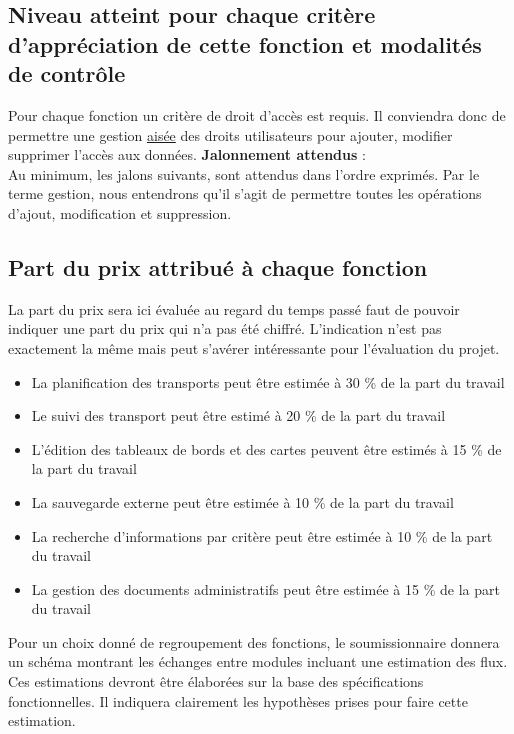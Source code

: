 \subsection{Niveau atteint pour chaque critère d'appréciation de cette fonction et modalités de contrôle}
Pour chaque fonction un critère de droit d'accès est requis. Il conviendra donc de permettre une gestion \underline{aisée} des droits utilisateurs pour ajouter, modifier supprimer l'accès aux données.
\textbf{Jalonnement attendus} :
\\
Au minimum, les jalons suivants, sont attendus dans l'ordre exprimés. Par le terme \og{}gestion\fg{}, nous entendrons qu'il s'agit de permettre toutes les opérations d'ajout, modification et suppression.

\subsection{Part du prix attribué à chaque fonction}
La part du prix sera ici évaluée au regard du temps passé faut de pouvoir indiquer une part du prix qui n'a pas été chiffré. L'indication n'est pas exactement la même mais peut s'avérer intéressante pour l'évaluation du projet. 
\begin{itemize}
 \item La planification des transports peut être estimée à 30 \% de la part du travail
 \item Le suivi des transport peut être estimé à 20 \% de la part du travail
 \item L'édition des tableaux de bords et des cartes peuvent être estimés à 15 \% de la part du travail
 \item La sauvegarde externe peut être estimée à 10 \% de la part du travail
 \item La recherche d'informations par critère peut être estimée à 10 \% de la part du travail
 \item La gestion des documents administratifs peut être estimée à 15 \% de la part du travail
\end{itemize}
Pour un choix donné de regroupement des fonctions, le soumissionnaire donnera un schéma montrant les échanges entre modules incluant une estimation des flux. 
\\
Ces estimations devront être élaborées sur la base des spécifications fonctionnelles. Il indiquera clairement les hypothèses prises pour faire cette estimation. 

